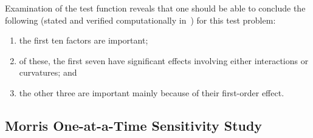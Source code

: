 Examination of the test function reveals that one should be able to
conclude the following (stated and verified computationally
in~\cite{Sal04}) for this test problem:
\begin{enumerate}
\item the first ten factors are important;
\item of these, the first seven have significant effects involving
      either interactions or curvatures; and
\item the other three are important mainly because of their first-order
      effect.
\end{enumerate}

\subsection{Morris One-at-a-Time Sensitivity Study}

